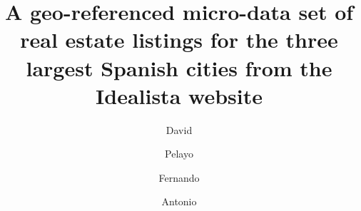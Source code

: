 \documentclass[times,final]{elsarticle}
\begin{document}

\begin{frontmatter}

\title{A geo-referenced micro-data set of real estate listings for the three largest Spanish cities from the Idealista website}%

\author[1]{David }
\author[1]{Pelayo }
\author[2]{Fernando }
\author[3]{Antonio }

\address[1]{idealista, Plaza de las Cortes 5, 28014 Madrid, Spain}
\address[2]{Facultad de CC de la Empresa, Universidad Politécnica de Cartagena, C/ Real, 3. 30201 Cartagena, Murcia (Spain)}
\address[3]{School of Earth, Environment and Society, McMaster University, 1280 Main St W, Hamilton, Ontario L8S 4K1 Canada}




\end{frontmatter}
\end{document}
